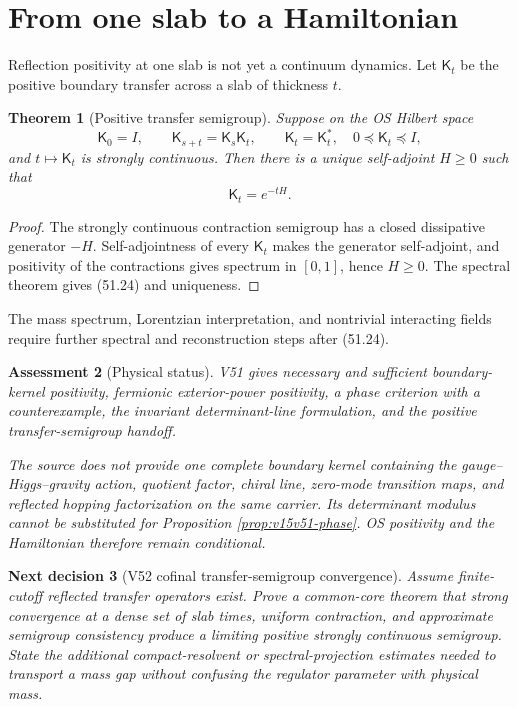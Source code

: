 \documentclass[11pt]{article}
\newtheorem{theorem}{Theorem}[section]
\newtheorem{decision}[theorem]{Next decision}
\newtheorem{assessment}[theorem]{Assessment}
\theoremstyle{remark}
\begin{document}
\section{From one slab to a Hamiltonian}

Reflection positivity at one slab is not yet a continuum dynamics.
Let \({\mathsf K}_t\) be the positive boundary transfer across a
slab of thickness \(t\).

\begin{theorem}[Positive transfer semigroup]
\label{thm:v15v51-semigroup}
Suppose on the OS Hilbert space
\[
 {\mathsf K}_0=I,\qquad
 {\mathsf K}_{s+t}={\mathsf K}_s{\mathsf K}_t,\qquad
 {\mathsf K}_t={\mathsf K}_t^*,\quad
 0\preceq{\mathsf K}_t\preceq I,                        \tag{51.23}
\]
and \(t\mapsto{\mathsf K}_t\) is strongly continuous.  Then there is
a unique self-adjoint \(H\geq0\) such that
\[
 {\mathsf K}_t=e^{-tH}.                                 \tag{51.24}
\]
\end{theorem}

\begin{proof}
The strongly continuous contraction semigroup has a closed
dissipative generator \(-H\).  Self-adjointness of every
\({\mathsf K}_t\) makes the generator self-adjoint, and positivity
of the contractions gives spectrum in \([0,1]\), hence
\(H\geq0\).  The spectral theorem gives (51.24) and uniqueness.
\end{proof}

The mass spectrum, Lorentzian interpretation, and nontrivial
interacting fields require further spectral and reconstruction
steps after (51.24).

\begin{assessment}[Physical status]
\label{ass:v15v51-status}
V51 gives necessary and sufficient boundary-kernel positivity,
fermionic exterior-power positivity, a phase criterion with a
counterexample, the invariant determinant-line formulation, and
the positive transfer-semigroup handoff.

The source does not provide one complete boundary kernel containing
the gauge--Higgs--gravity action, quotient factor, chiral line,
zero-mode transition maps, and reflected hopping factorization on
the same carrier.  Its determinant modulus cannot be substituted
for Proposition \ref{prop:v15v51-phase}.  OS positivity and the
Hamiltonian therefore remain conditional.
\end{assessment}

\begin{decision}[V52 cofinal transfer-semigroup convergence]
\label{dec:v15v51-next}
Assume finite-cutoff reflected transfer operators exist.  Prove a
common-core theorem that strong convergence at a dense set of slab
times, uniform contraction, and approximate semigroup consistency
produce a limiting positive strongly continuous semigroup.  State
the additional compact-resolvent or spectral-projection estimates
needed to transport a mass gap without confusing the regulator
parameter with physical mass.
\end{decision}
\end{document}
